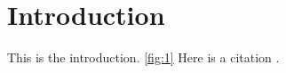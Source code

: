 \section{Introduction}This is the introduction. \cref{fig:1} Here is a citation \cite{shao2025coopec,wu2021ucb,jing2019lyapunov,yun2022gadqn,maddpg2017}.